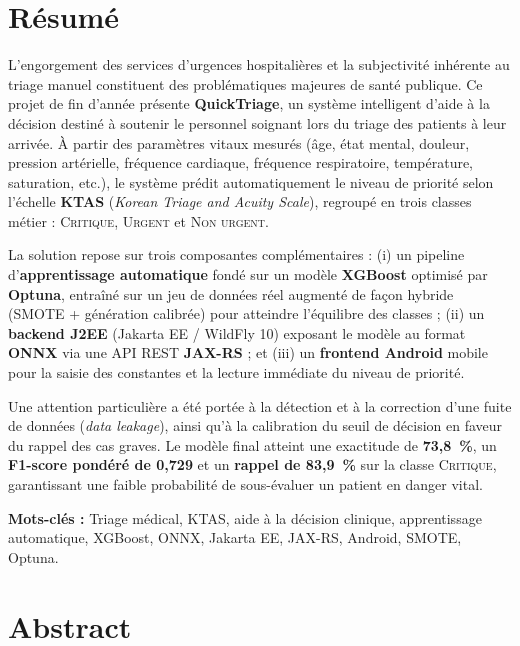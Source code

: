 \documentclass{rapportENSIAS}
\begin{document}
\chapter*{Résumé}

L'engorgement des services d'urgences hospitalières et la subjectivité inhérente au
triage manuel constituent des problématiques majeures de santé publique. Ce projet de
fin d'année présente \textbf{QuickTriage}, un système intelligent d'aide à la décision
destiné à soutenir le personnel soignant lors du triage des patients à leur arrivée.
À partir des paramètres vitaux mesurés (âge, état mental, douleur, pression artérielle,
fréquence cardiaque, fréquence respiratoire, température, saturation, etc.), le système
prédit automatiquement le niveau de priorité selon l'échelle \textbf{KTAS} (\textit{Korean
Triage and Acuity Scale}), regroupé en trois classes métier : \textsc{Critique},
\textsc{Urgent} et \textsc{Non urgent}.

La solution repose sur trois composantes complémentaires : (i) un pipeline
d'\textbf{apprentissage automatique} fondé sur un modèle \textbf{XGBoost} optimisé par
\textbf{Optuna}, entraîné sur un jeu de données réel augmenté de façon hybride
(SMOTE + génération calibrée) pour atteindre l'équilibre des classes ; (ii) un
\textbf{backend J2EE} (Jakarta EE / WildFly 10) exposant le modèle au format
\textbf{ONNX} via une API REST \textbf{JAX-RS} ; et (iii) un \textbf{frontend Android}
mobile pour la saisie des constantes et la lecture immédiate du niveau de priorité.

Une attention particulière a été portée à la détection et à la correction d'une fuite de
données (\textit{data leakage}), ainsi qu'à la calibration du seuil de décision en faveur
du rappel des cas graves. Le modèle final atteint une exactitude de \textbf{73,8~\%},
un \textbf{F1-score pondéré de 0,729} et un \textbf{rappel de 83,9~\%} sur la classe
\textsc{Critique}, garantissant une faible probabilité de sous-évaluer un patient en
danger vital.

\vspace{0.4cm}
\noindent\textbf{Mots-clés :} Triage médical, KTAS, aide à la décision clinique,
apprentissage automatique, XGBoost, ONNX, Jakarta EE, JAX-RS, Android, SMOTE, Optuna.

\chapter*{Abstract}
\end{document}
